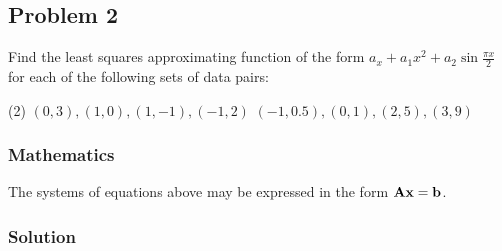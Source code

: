 \subsection{Problem 2}%
\label{sec:problem_2}
Find the least squares approximating function of the form
$a_x+a_1x^2+a_2\sin{\frac{\pi{}x}{2}}$ for each of the following sets of data pairs:
\begin{tasks}(2)
  \task $(0,3),(1,0),(1,-1),(-1,2)$
  \task $(-1,0.5),(0,1),(2,5),(3,9)$
\end{tasks}
\subsubsection*{Mathematics}
The systems of equations above may be expressed in the form $\mathbf{Ax}=\mathbf{b}$.
\subsubsection*{Solution}
